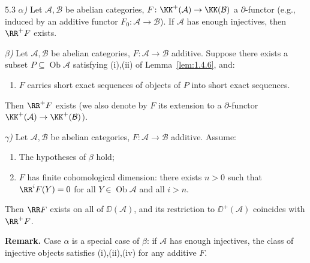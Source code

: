 \begin{bookcorollary}{5.3}\label{cor:1.5.3}
\emph{$\alpha$)} Let $\mathcal{A},\mathcal{B}$ be abelian categories, $F\colon\KK^+(\mathcal{A})\to\KK(\mathcal{B})$ a $\partial$-functor (e.g., induced by an additive functor $F_0\colon\mathcal{A}\to\mathcal{B}$). If $\mathcal{A}$ has enough injectives, then $\RR^+F$ exists.

\emph{$\beta$)} Let $\mathcal{A},\mathcal{B}$ be abelian categories, $F\colon\mathcal{A}\to\mathcal{B}$ additive. Suppose there exists a subset $P\subseteq\operatorname{Ob}\mathcal{A}$ satisfying (i),(ii) of Lemma~\ref{lem:1.4.6}, and:
\begin{enumerate}
\item[(iv)] $F$ carries short exact sequences of objects of $P$ into short exact sequences.
\end{enumerate}
Then $\RR^+F$ exists (we also denote by $F$ its extension to a $\partial$-functor $\KK^+(\mathcal{A})\to\KK^+(\mathcal{B})$).

\emph{$\gamma$)} Let $\mathcal{A},\mathcal{B}$ be abelian categories, $F\colon\mathcal{A}\to\mathcal{B}$ additive. Assume:
\begin{enumerate}
\item[(a)] The hypotheses of $\beta$ hold;
\item[(b)] $F$ has finite cohomological dimension: there exists $n>0$ such that $\RR^iF(Y)=0$ for all $Y\in\operatorname{Ob}\mathcal{A}$ and all $i>n$.
\end{enumerate}
Then $\RR F$ exists on all of $\DD(\mathcal{A})$, and its restriction to $\DD^+(\mathcal{A})$ coincides with $\RR^+F$.
\end{bookcorollary}

\textbf{Remark.} Case $\alpha$ is a special case of $\beta$: if $\mathcal{A}$ has enough injectives, the class of injective objects satisfies (i),(ii),(iv) for any additive $F$.

